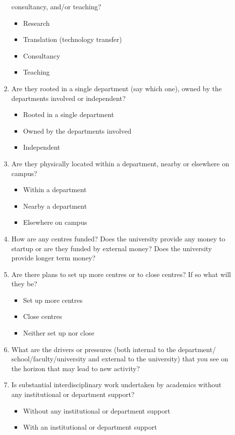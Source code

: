 \begin{enumerate}
\begin{enumerate}
consultancy, and/or teaching?
\begin{itemize}
\item Research
\item Translation (technology transfer)
\item Consultancy
\item Teaching
\end{itemize}
\item Are they rooted in a single department (say which one), owned by
the departments involved or independent?
\begin{itemize}
\item Rooted in a single department
\item Owned by the departments involved
\item Independent
\end{itemize}
\item Are they physically located within a department, nearby or
elsewhere on campus?
\begin{itemize}
\item Within a department
\item Nearby a department
\item Elsewhere on campus
\end{itemize}
\item How are any centres funded? Does the university provide any
money to startup or are they funded by external money? Does the
university provide longer term money?
\item Are there plans to set up more centres or to close centres? If so
what will they be?
\begin{itemize}
\item Set up more centres
\item Close centres
\item Neither set up nor close
\end{itemize}
\item What are the drivers or pressures (both internal to the department/
school/faculty/university and external to the university)
that you see on the horizon that may lead to new activity?
\item Is substantial interdisciplinary work undertaken by academics
without any institutional or department support?
\begin{itemize}
\item Without any institutional or department support
\item With an institutional or department support
\end{itemize}

\end{enumerate}
\end{enumerate}
